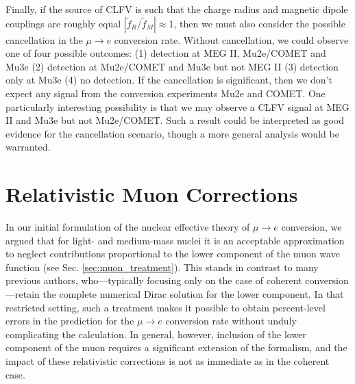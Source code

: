 \documentclass[12pt,letterpaper]{book}
\begin{document}
Finally, if the source of CLFV is such that the charge radius and magnetic dipole couplings are roughly equal $|\tilde{f}_R/\tilde{f}_M|\approx 1$, then we must also consider the possible cancellation in the $\mu\rightarrow e$ conversion rate. Without cancellation, we could observe one of four possible outcomes: (1) detection at MEG II, Mu2e/COMET and Mu3e (2) detection at Mu2e/COMET and Mu3e but not MEG II (3) detection only at Mu3e (4) no detection. If the cancellation is significant, then we don't expect any signal from the conversion experiments Mu2e and COMET. One particularly interesting possibility is that we may observe a CLFV signal at MEG II and Mu3e but not Mu2e/COMET. Such a result could be interpreted as good evidence for the cancellation scenario, though a more general analysis would be warranted.
\chapter{Relativistic Muon Corrections}
\label{chap:muon_lower}
In our initial formulation of the nuclear effective theory of $\mu\rightarrow e$ conversion, we argued that for light- and medium-mass nuclei it is an acceptable approximation to neglect contributions proportional to the lower component of the muon wave function (see Sec. \ref{sec:muon_treatment}). This stands in contrast to many previous authors, who---typically focusing only on the case of coherent conversion---retain the complete numerical Dirac solution for the lower component. In that restricted setting, such a treatment makes it possible to obtain percent-level errors in the prediction for the $\mu\rightarrow e$ conversion rate without unduly complicating the calculation. In general, however, inclusion of the lower component of the muon requires a significant extension of the formalism, and the impact of these relativistic corrections is not as immediate as in the coherent case.  
\end{document}
